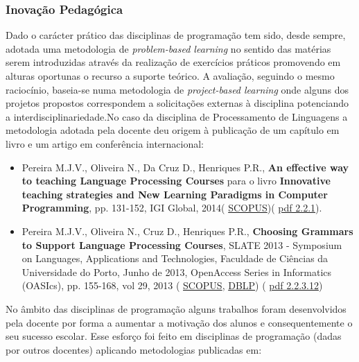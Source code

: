 \documentclass[11pt]{article}
\begin{document}
\subsubsection{Inovação Pedagógica}Dado o carácter prático das disciplinas de programação tem sido, desde sempre, adotada uma metodologia de {
\em{ problem-based learning}} no sentido das matérias serem introduzidas através da realização de exercícios práticos promovendo em alturas oportunas o recurso a suporte teórico. A avaliação, seguindo o mesmo raciocínio, baseia-se numa metodologia de {
\em{ project-based learning}} onde alguns dos projetos propostos correspondem a solicitações externas à disciplina potenciando a interdisciplinariedade.No caso da disciplina de Processamento de Linguagens a metodologia adotada pela docente deu origem à publicação de um capítulo em livro e um artigo em conferência internacional:
\begin{itemize}
\item{Pereira M.J.V., Oliveira N., Da Cruz D., Henriques P.R., {
\bf{ An effective way to teaching Language Processing Courses}} para o livro {
\bf{ Innovative teaching strategies and New Learning Paradigms in Computer Programming}}, pp. 131-152, IGI Global, 2014(
\href{run:Publicacoes/PublicacoesSCOPUS.pdf}{SCOPUS})(
\href{run:Publicacoes/publicacoes/78.pdf}{pdf 2.2.1}).}
\item{Pereira M.J.V., Oliveira N., Cruz D., Henriques P.R., {
\bf{ Choosing Grammars to Support Language Processing Courses}}, SLATE 2013 - Symposium on Languages, Applications and Technologies, Faculdade de Ciências da Universidade do Porto, Junho de 2013, OpenAccess Series in Informatics (OASIcs), pp. 155-168, vol 29, 2013 (
\href{run:Publicacoes/PublicacoesSCOPUS.pdf}{SCOPUS},
\href{run:Publicacoes/ComprovativosDBLP.pdf}{DBLP}) (
\href{run:Publicacoes/publicacoes/71.pdf}{pdf 2.2.3.12})}
\end{itemize}No âmbito das disciplinas de programação alguns trabalhos foram desenvolvidos pela docente por forma a aumentar a motivação dos alunos e consequentemente o seu sucesso escolar. Esse esforço foi feito em disciplinas de programação (dadas por outros docentes) aplicando metodologias publicadas em:
\end{document}
